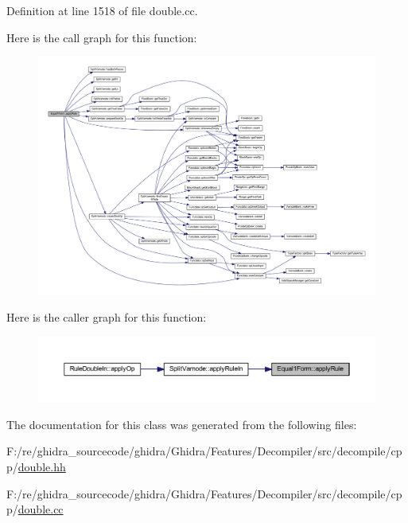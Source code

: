 Definition at line 1518 of file double.\+cc.

Here is the call graph for this function\+:
\nopagebreak
\begin{figure}[H]
\begin{center}
\leavevmode
\includegraphics[width=350pt]{class_equal1_form_aa1eb2fc408ca8a368e04baa798fc23e7_cgraph}
\end{center}
\end{figure}
Here is the caller graph for this function\+:
\nopagebreak
\begin{figure}[H]
\begin{center}
\leavevmode
\includegraphics[width=350pt]{class_equal1_form_aa1eb2fc408ca8a368e04baa798fc23e7_icgraph}
\end{center}
\end{figure}


The documentation for this class was generated from the following files\+:\begin{DoxyCompactItemize}
\item 
F\+:/re/ghidra\+\_\+sourcecode/ghidra/\+Ghidra/\+Features/\+Decompiler/src/decompile/cpp/\mbox{\hyperlink{double_8hh}{double.\+hh}}\item 
F\+:/re/ghidra\+\_\+sourcecode/ghidra/\+Ghidra/\+Features/\+Decompiler/src/decompile/cpp/\mbox{\hyperlink{double_8cc}{double.\+cc}}\end{DoxyCompactItemize}
